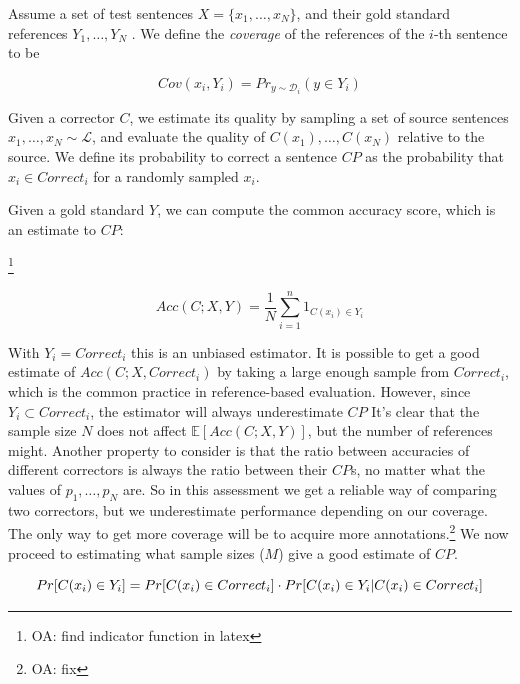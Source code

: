 \documentclass[english]{article}
\newcommand{\oa}[1]{\footnote{\color{red}OA: #1}}
\begin{document}
Assume a set of test sentences $X=\{x_1,\ldots,x_N\}$,
and their gold standard references $Y_1,\ldots,Y_N$ . We define the
{\it coverage} of the references of the $i$-th sentence to be

\begin{equation}
  Cov(x_i,Y_i)=Pr_{y \sim \mathcal{D}_i}(y \in Y_i)
\end{equation}

Given a corrector $C$, we estimate its quality by sampling a set of source sentences
$x_1,\ldots,x_N \sim \mathcal{L}$, and evaluate the quality of $C(x_1),\ldots,C(x_N)$ relative
to the source. We define its probability to correct a sentence $CP$
as the probability that $x_i \in Correct_i$ for a randomly sampled $x_i$.

Given a gold standard $Y$,  we can compute the common accuracy score, which is an estimate to $CP$:

\oa{find indicator function in latex}

\begin{equation}
  Acc(C;X,Y) = \frac{1}{N} \sum_{i=1}^n 1_{C(x_i) \in Y_i}
\end{equation}

With $Y_i=Correct_i$ this is an unbiased estimator. It is possible to get a good estimate of $Acc(C;X,Correct_i)$
by taking a large enough sample from $Correct_i$, which is the common practice in reference-based evaluation. However,
since $Y_i \subset Correct_i$, the estimator will always underestimate $CP$
It's clear that the sample size $N$ does not affect $\mathbb{E}[Acc(C;X,Y)]$, but the number of references
might. Another property to consider is that the ratio between accuracies of different correctors
is always the ratio between their $CP$s, no matter what the values of $p_1,\ldots,p_N$ are.
So in this assessment we get a reliable way of comparing two correctors,
but we underestimate performance depending on our coverage. The only way to get more coverage
will be to acquire more annotations.\oa{fix} 
We now proceed to estimating what sample sizes ($M$) give a good estimate of $CP$.

\begin{equation}
  \small
  Pr[C(x_i) \in Y_i] = 
  Pr[C(x_i) \in Correct_i] \cdot Pr[C(x_i) \in Y_i | C(x_i) \in Correct_i]
  \label{eq:xxx}
\end{equation}
\end{document}
